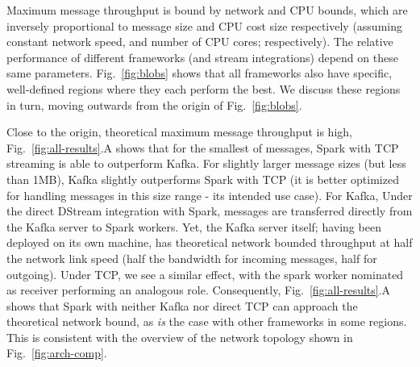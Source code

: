 \documentclass[conference]{IEEEtran}
\begin{document}


Maximum message throughput is bound by network and CPU bounds, which are inversely proportional to message size and CPU cost size respectively (assuming constant network speed, and number of CPU cores; respectively). The relative performance of different frameworks (and stream integrations) depend on these same parameters. Fig.~\ref{fig:blobs} shows that all frameworks also have specific, well-defined regions where they each perform the best. We discuss these regions in turn, moving outwards from the origin of Fig.~\ref{fig:blobs}.

Close to the origin, theoretical maximum message throughput is high, Fig.~\ref{fig:all-results}.A shows that for the smallest of messages, Spark with TCP streaming is able to outperform Kafka. 
For slightly larger message sizes (but less than 1MB), Kafka slightly outperforms Spark with TCP (it is better optimized for handling messages in this size range - its intended use case). For Kafka, Under the direct DStream integration with Spark, messages are transferred directly from the Kafka server to Spark workers. Yet, the Kafka server itself; having been deployed on its own machine, has theoretical network bounded throughput at half the network link speed (half the bandwidth for incoming messages, half for outgoing). Under TCP, we see a similar effect, with the spark worker nominated as receiver performing an analogous role. Consequently, Fig.~\ref{fig:all-results}.A shows that Spark with neither Kafka nor direct TCP can approach the theoretical network bound, as \emph{is} the case with other frameworks in some regions. This is consistent with the overview of the network topology shown in Fig.~\ref{fig:arch-comp}.
\end{document}
